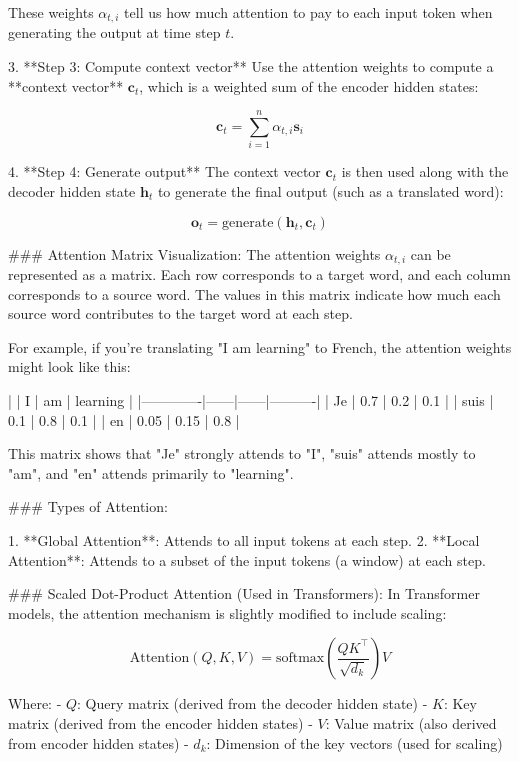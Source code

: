    These weights \(\alpha_{t,i}\) tell us how much attention to pay to each input token when generating the output at time step \(t\).

3. **Step 3: Compute context vector**  
   Use the attention weights to compute a **context vector** \(\mathbf{c}_t\), which is a weighted sum of the encoder hidden states:

   \[
   \mathbf{c}_t = \sum_{i=1}^{n} \alpha_{t,i} \mathbf{s}_i
   \]

4. **Step 4: Generate output**  
   The context vector \(\mathbf{c}_t\) is then used along with the decoder hidden state \(\mathbf{h}_t\) to generate the final output (such as a translated word):

   \[
   \mathbf{o}_t = \text{generate}(\mathbf{h}_t, \mathbf{c}_t)
   \]

### Attention Matrix Visualization:
The attention weights \(\alpha_{t,i}\) can be represented as a matrix. Each row corresponds to a target word, and each column corresponds to a source word. The values in this matrix indicate how much each source word contributes to the target word at each step.

For example, if you're translating "I am learning" to French, the attention weights might look like this:

|             | I    | am   | learning |
|-------------|------|------|----------|
| Je          | 0.7  | 0.2  | 0.1      |
| suis        | 0.1  | 0.8  | 0.1      |
| en          | 0.05 | 0.15 | 0.8      |

This matrix shows that "Je" strongly attends to "I", "suis" attends mostly to "am", and "en" attends primarily to "learning".

### Types of Attention:

1. **Global Attention**: Attends to all input tokens at each step.
2. **Local Attention**: Attends to a subset of the input tokens (a window) at each step.

### Scaled Dot-Product Attention (Used in Transformers):
In Transformer models, the attention mechanism is slightly modified to include scaling:

\[
\text{Attention}(Q, K, V) = \text{softmax}\left(\frac{QK^\top}{\sqrt{d_k}}\right)V
\]

Where:
- \(Q\): Query matrix (derived from the decoder hidden state)
- \(K\): Key matrix (derived from the encoder hidden states)
- \(V\): Value matrix (also derived from encoder hidden states)
- \(d_k\): Dimension of the key vectors (used for scaling)

